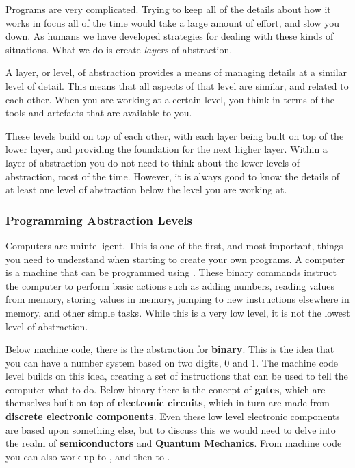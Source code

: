 Programs are very complicated. Trying to keep all of the details about how it works in focus all of the time would take a large amount of effort, and slow you down. As humans we have developed strategies for dealing with these kinds of situations. What we do is create \emph{layers} of abstraction.

A layer, or level, of abstraction provides a means of managing details at a similar level of detail. This means that all aspects of that level are similar, and related to each other. When you are working at a certain level, you think in terms of the tools and artefacts that are available to you. 

These levels build on top of each other, with each layer being built on top of the lower layer, and providing the foundation for the next higher layer. Within a layer of abstraction you do not need to think about the lower levels of abstraction, most of the time. However, it is always good to know the details of at least one level of abstraction below the level you are working at.

\subsubsection{Programming Abstraction Levels} %
\label{ssub:programming_abstraction_levels}

Computers are unintelligent. This is one of the first, and most important, things you need to understand when starting to create your own programs. A computer is a machine that can be programmed using . These binary commands instruct the computer to perform basic actions such as adding numbers, reading values from memory, storing values in memory, jumping to new instructions elsewhere in memory, and other simple tasks. While this is a very low level, it is not the lowest level of abstraction.

Below machine code, there is the abstraction for \textbf{binary}. This is the idea that you can have a number system based on two digits, 0 and 1. The machine code level builds on this idea, creating a set of instructions that can be used to tell the computer what to do. Below binary there is the concept of \textbf{gates}, which are themselves built on top of \textbf{electronic circuits}, which in turn are made from \textbf{discrete electronic components}. Even these low level electronic components are based upon something else, but to discuss this we would need to delve into the realm of \textbf{semiconductors} and \textbf{Quantum Mechanics}. From machine code you can also work up to , and then to .

